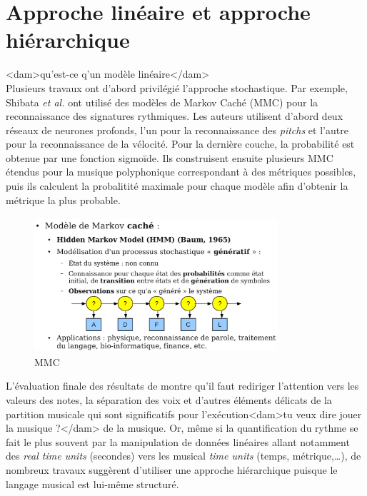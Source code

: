 \section{Approche linéaire et approche hiérarchique}
<dam>qu'est-ce q'un modèle linéaire</dam>\\

Plusieurs travaux ont d’abord privilégié l’approche stochastique. Par exemple,
Shibata \textit{et al.} \cite{SHIBATA2021262} ont utilisé des modèles de Markov
Caché (MMC) pour la reconnaissance
des signatures rythmiques. Les auteurs utilisent d’abord deux réseaux de
neurones profonds, l’un pour la reconnaissance des \textit{pitchs} et l’autre
pour la reconnaissance de la vélocité. Pour la dernière couche, la probabilité
est obtenue par une fonction sigmoïde. Ils construisent ensuite plusieurs MMC
étendus pour la musique polyphonique correspondant à des métriques possibles,
puis ils calculent la probalitité maximale pour chaque modèle afin d’obtenir la
métrique la plus probable.\\

\begin{figure}[h]
	\centering
	\includegraphics[height=50mm, width=90mm]{
    z_images/2_etat_de_l_art/0_hmm.png}
	\caption[MMC]{MMC\footnotemark}
\end{figure}

L’évaluation finale des résultats de \cite{SHIBATA2021262} montre qu’il faut
rediriger l’attention vers les valeurs des notes, la séparation des voix et
d'autres éléments délicats de la partition musicale qui sont significatifs pour
l'exécution<dam>tu veux dire jouer la musique ?</dam> de la musique. 
Or, même si la quantification du rythme se fait le plus souvent par la
manipulation de données linéaires allant notamment des \textit{real time units}
(secondes) vers les musical \textit{time units} (temps, métrique,…), de
nombreux travaux suggèrent d’utiliser une approche hiérarchique puisque le
langage musical est lui-même structuré.

